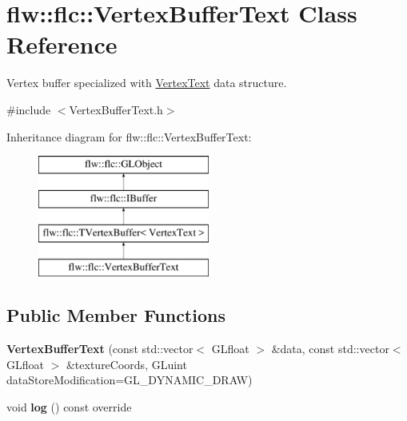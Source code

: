 \hypertarget{classflw_1_1flc_1_1VertexBufferText}{}\section{flw\+:\+:flc\+:\+:Vertex\+Buffer\+Text Class Reference}
\label{classflw_1_1flc_1_1VertexBufferText}


Vertex buffer specialized with \hyperlink{structflw_1_1flc_1_1VertexText}{Vertex\+Text} data structure.  




{\ttfamily \#include $<$Vertex\+Buffer\+Text.\+h$>$}

Inheritance diagram for flw\+:\+:flc\+:\+:Vertex\+Buffer\+Text\+:\begin{figure}[H]
\begin{center}
\leavevmode
\includegraphics[height=4.000000cm]{classflw_1_1flc_1_1VertexBufferText}
\end{center}
\end{figure}
\subsection*{Public Member Functions}
\begin{DoxyCompactItemize}
\item 
{\bfseries Vertex\+Buffer\+Text} (const std\+::vector$<$ G\+Lfloat $>$ \&data, const std\+::vector$<$ G\+Lfloat $>$ \&texture\+Coords, G\+Luint data\+Store\+Modification=G\+L\+\_\+\+D\+Y\+N\+A\+M\+I\+C\+\_\+\+D\+R\+AW)\hypertarget{classflw_1_1flc_1_1VertexBufferText_a4d274aa17e9c891423933feea5b02bc2}{}\label{classflw_1_1flc_1_1VertexBufferText_a4d274aa17e9c891423933feea5b02bc2}

\item 
void {\bfseries log} () const override\hypertarget{classflw_1_1flc_1_1VertexBufferText_afd6bb4981dd84c85cc39946fff41b3e4}{}\label{classflw_1_1flc_1_1VertexBufferText_afd6bb4981dd84c85cc39946fff41b3e4}

\end{DoxyCompactItemize}
